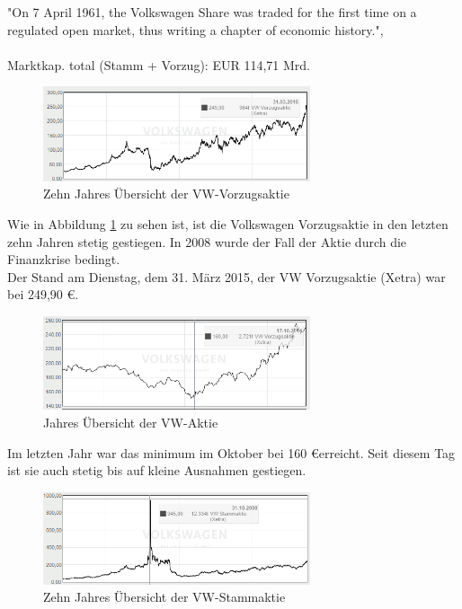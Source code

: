 \documentclass[12pt]{article}
\begin{document}
"On 7 April 1961, the Volkswagen Share was traded for the first time on a regulated open market, thus writing a chapter of economic history.",\cite{vsc50y} \\
\\
Marktkap. total (Stamm + Vorzug): EUR 114,71 Mrd.
\begin{figure}[here!]
\centering
\includegraphics[width=0.7\textwidth]{images/finanzen2015}
\caption{Zehn Jahres Übersicht der VW-Vorzugsaktie \cite{aktienfotos}}
\label{fig:vwaktie1}
\end{figure}\FloatBarrier
\noindent
Wie in Abbildung \ref{fig:vwaktie1} zu sehen ist, ist die Volkswagen Vorzugsaktie in den letzten zehn Jahren stetig gestiegen. In 2008 wurde der Fall der Aktie durch die Finanzkrise bedingt.\\
Der Stand am Dienstag, dem 31. März 2015, der VW Vorzugsaktie (Xetra) war bei 249,90 \euro.
\begin{figure}[here!]
\centering
\includegraphics[width=0.7\textwidth]{images/finanzen20151}
\caption{Jahres Übersicht der VW-Aktie \cite{aktienfotos}}
\label{fig:vwaktie3}
\end{figure}\FloatBarrier
\noindent
Im letzten Jahr war das minimum im Oktober bei 160 \euro erreicht. Seit diesem Tag ist sie auch stetig bis auf kleine Ausnahmen gestiegen.
\begin{figure}[here!]
\centering
\includegraphics[width=0.7\textwidth]{images/finanzen2015S}
\caption{Zehn Jahres Übersicht der VW-Stammaktie \cite{aktienfotos}}
\label{fig:vwaktie2}
\end{figure}\FloatBarrier
\end{document}
